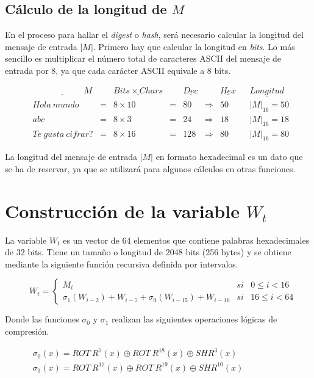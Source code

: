 \documentclass{article}
\begin{document}
    \subsection{Cálculo de la longitud de $M$}
        En el proceso para hallar el \textit{digest} o \textit{hash}, será necesario calcular la longitud del mensaje de entrada $|M|$. Primero hay que calcular la longitud en \textit{bits}. Lo más sencillo es multiplicar el número total de caracteres ASCII del mensaje de entrada por 8, ya que cada carácter ASCII equivale a 8 bits.
            \begin{figure}[H]
            \centering
                $\begin{array}{rccclclcl}
                    \underline{\qquad \qquad \qquad M} & & \underline{Bits \times Chars} & & \underline{Dec} & & \underline{Hex} & & \underline{Longitud}\\
                    Hola \ mundo & = & 8 \times 10 & = & 80 & \Rightarrow & 50 & & |M|_{16} = 50 \\
                    abc & = & 8 \times 3 \ & = & 24 & \Rightarrow & 18 & & |M|_{16} = 18  \\
                    Te \ gusta \ cifrar? & = & 8 \times 16 & = & 128 & \Rightarrow & 80 & & |M|_{16} = 80
                \end{array}$
            \end{figure}
        La longitud del mensaje de entrada $|M|$ en formato hexadecimal es un dato que se ha de reservar, ya que se utilizará para algunos cálculos en otras funciones.

\section{Construcción de la variable $W_{t}$}
    La variable $W_{t}$ es un vector de 64 elementos que contiene palabras hexadecimales de 32 bits. Tiene un tamaño o longitud de 2048 bits (256 bytes) y se obtiene mediante la siguiente función recursiva definida por intervalos.
        \begin{figure}[H]
        \centering
            $W_{t} = \left \{
            \begin{array}{lcl}
                M_{i} & si & 0 \le i < 16 \\
                \sigma_{1}(W_{i-2})+W_{i-7}+\sigma_{0}(W_{i-15})+W_{i-16} & si & 16 \le i < 64
            \end{array}
            \right .$
        \end{figure}
    Donde las funciones  $\sigma_{0}$ y $\sigma_{1}$ realizan las siguientes operaciones lógicas de compresión.
        \begin{figure}[H]
        \centering
            $\begin{array}{l}
                \sigma_{0}(x) = ROT \ R^{7}(x) \oplus ROT \ R^{18}(x) \oplus SHR^{3}(x) \\
                \sigma_{1}(x) = ROT \ R^{17}(x) \oplus ROT \ R^{19}(x) \oplus SHR^{10}(x)
            \end{array}$
        \end{figure}
    
\end{document}
